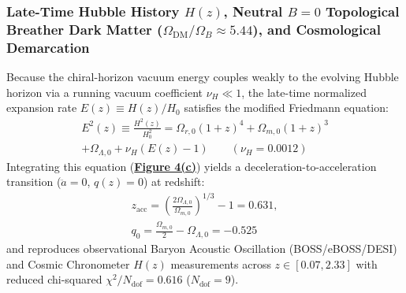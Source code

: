\documentclass[10pt,aps,prd,twocolumn,superscriptaddress,nofootinbib,floatfix,longbibliography,showkeys]{revtex4-2}
\begin{document}
\subsubsection{Late-Time Hubble History $H(z)$, Neutral $B=0$ Topological Breather Dark Matter ($\Omega_{\text{DM}}/\Omega_B \approx 5.44$), and Cosmological Demarcation}

Because the chiral-horizon vacuum energy couples weakly to the evolving Hubble horizon via a running vacuum coefficient $\nu_H \ll 1$, the late-time normalized expansion rate $E(z) \equiv H(z)/H_0$ satisfies the modified Friedmann equation:
\begin{multline}
E^2(z) \equiv \frac{H^2(z)}{H_0^2} = \Omega_{r,0}(1+z)^4 + \Omega_{m,0}(1+z)^3 \\
+ \Omega_{\Lambda,0} + \nu_H\left(E(z) - 1\right) \qquad (\nu_H = 0.0012)
\end{multline}
Integrating this equation (\textbf{\hyperref[fig:fig4]{Figure 4(c)}}) yields a deceleration-to-acceleration transition ($\ddot{a} = 0$, $q(z) = 0$) at redshift:
\begin{equation}\begin{gathered}
z_{\text{acc}} = \left(\frac{2\Omega_{\Lambda,0}}{\Omega_{m,0}}\right)^{1/3} - 1 = 0.631, \\
q_0 = \frac{\Omega_{m,0}}{2} - \Omega_{\Lambda,0} = -0.525
\end{gathered}\end{equation}
and reproduces observational Baryon Acoustic Oscillation (BOSS/eBOSS/DESI) and Cosmic Chronometer $H(z)$ measurements across $z \in [0.07, 2.33]$ with reduced chi-squared \textbf{$\chi^2 / N_{\text{dof}} = 0.616$} ($N_{\text{dof}} = 9$).
\end{document}
